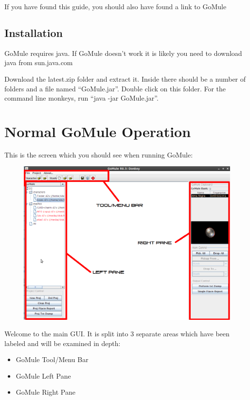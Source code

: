 \documentclass[a4paper,10pt]{article}
\begin{document}
If you have found this guide, you should also have found a link to GoMule

\subsection{Installation}

GoMule requires java. If GoMule doesn't work it is likely you need to download java from sun.java.com

Download the latest.zip folder and extract it. Inside there should be a number of folders and a file named ``GoMule.jar''. Double click on this folder. For the command line monkeys, run ``java -jar GoMule.jar''.

\section{Normal GoMule Operation}

This is the screen which you should see when running GoMule:

\begin{figure}[htp]
\centering
 \includegraphics[width=140mm]{baseGUI.png}

\end{figure}

Welcome to the main GUI. It is split into 3 separate areas which have been labeled and will be examined in depth:
\begin{itemize}
 \item GoMule Tool/Menu Bar
 \item GoMule Left Pane
 \item GoMule Right Pane
\end{itemize}
\end{document}
